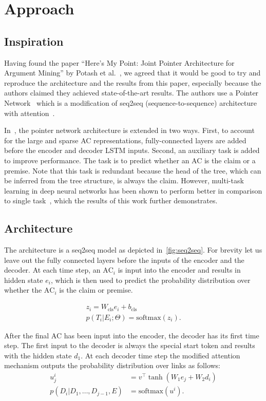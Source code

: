 \documentclass[onecolumn]{article}
\begin{document}
\section{Approach}
\subsection{Inspiration}
Having found the paper ``Here's My Point: Joint Pointer Architecture for Argument Mining'' by Potash et al.~\cite{potash2017here}, we agreed that it
would be good to try and reproduce the architecture and the results from this paper, especially because the authors claimed they achieved
state-of-the-art results. The authors use a Pointer Network~\cite{pn} which is a modification of seq2seq (sequence-to-sequence) architecture~\cite{seq2seq} with attention~\cite{attention}.

In~\cite{potash2017here}, the pointer network architecture is extended in two ways.
First, to account for the large and sparse AC representations, fully-connected layers are added before the encoder and decoder LSTM inputs.
Second, an auxiliary task is added to improve performance. The task is to predict whether an AC is the claim or a premise.
Note that this task is redundant because the head of the tree, which can be inferred from the tree structure, is always the claim.
However, multi-task learning in deep neural networks has been shown to perform better in comparison to single task~\cite{multi}, which the results of this work further demonstrates.

\subsection{Architecture}
The architecture is a seq2seq model as depicted in~\autoref{fig:seq2seq}.
For brevity let us leave out the fully connected layers before the inputs of the encoder and the decoder.
At each time step, an $\text{AC}_i$ is input into the encoder and results in hidden state $e_i$,
which is then used to predict the probability distribution over whether the $\text{AC}_i$ is the claim or premise.

\begin{align*}
    z_i = W_{\text{cls}} e_i + b_{\text{cls}}\\
    p(T_i|E_i;\Theta) = \text{softmax}(z_i).
\end{align*}


After the final AC has been input into the encoder, the decoder has its first time step.
The first input to the decoder is always the special start token and results with the hidden state $d_1$.
At each decoder time step the modified attention mechanism outputs the probability distribution over links as follows:
\begin{align*}
    u_j^i &= v^\top \tanh(W_1e_j + W_2d_i)\\
    p(D_i|D_1,\dots,D_{j-1},E) &= \text{softmax}(u^i).
\end{align*}
\end{document}
